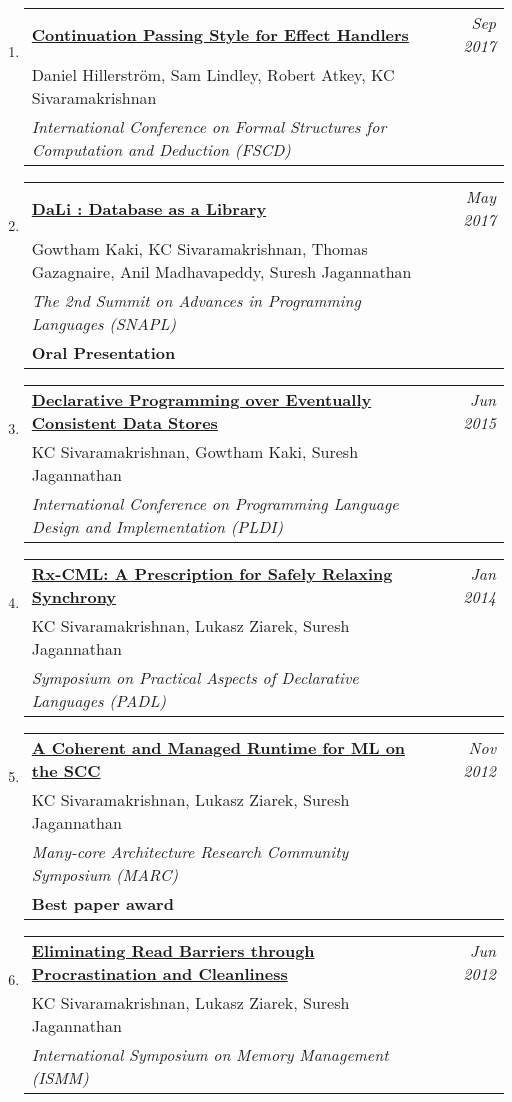 \documentclass[10pt]{article}
\makeatletter
\newcommand{\lbar}[1]{{\color{#1}\ding{118}}\hspace*{2pt}}
\newenvironment{benumerate}[2]{
    \let\oldItem\item
    \def\item{\addtocounter{enumi}{-2}\oldItem}
    \begin{enumerate}[#2] \itemsep3pt
    \setcounter{enumi}{#1}
    \addtocounter{enumi}{1}}
  {\end{enumerate}}
\newenvironment{publication}[5]
{ \item
  \begin{tabular*}{7.5in}{p{6.3in}@{\extracolsep{\fill}}r}
    \href{#1}{\textbf{#2}} & \textit{#3}\\ #4 &\\ \textit{#5}&\\
  \end{tabular*}
} {}
\newenvironment{publicationNote}[6]
{ \item
  \begin{tabular*}{7.5in}{p{6.3in}@{\extracolsep{\fill}}r}
    \href{#1}{\textbf{#2}} & \textit{#3}\\ #4 &\\ \textit{#5}\\ \textbf{#6} \\
  \end{tabular*}
} {}
\newenvironment{region}[3]{%
  \vspace*{0.5ex}
  {\scalebox{1.4}{\textbf{#1}}}
  \begin{benumerate}{#3}{\color{RoyalBlue}#2}}
  {\end{benumerate}\vspace{0.8ex}}
\makeatother
\begin{document}
\begin{region} {\lbar{purple}Conference Publications}{{C}1}{9}
	\begin{publication} {http://kcsrk.info/papers/cps-handler-fscd17.pdf}
		{Continuation Passing Style for Effect Handlers}
		{Sep 2017} {Daniel Hillerström, Sam Lindley, Robert Atkey, KC Sivaramakrishnan}
		{International Conference on Formal Structures for Computation and Deduction (FSCD)}
	\end{publication}

	\begin{publicationNote} {http://kcsrk.info/papers/dali_snapl17.pdf}
		{DaLi : Database as a Library}
		{May 2017} {Gowtham Kaki, KC Sivaramakrishnan, Thomas Gazagnaire, Anil Madhavapeddy, Suresh Jagannathan}
		{The 2nd Summit on Advances in Programming Languages (SNAPL)}
		{Oral Presentation}
	\end{publicationNote}

	\begin{publication} {http://kcsrk.info/papers/quelea_pldi15.pdf}
		{Declarative Programming over Eventually Consistent Data Stores}
		{Jun 2015} {KC Sivaramakrishnan, Gowtham Kaki, Suresh Jagannathan}
		{International Conference on Programming Language Design and Implementation (PLDI)}
	\end{publication}

	\begin{publication}{http://kcsrk.info/papers/rxcml_padl14.pdf}
		{Rx-CML: A Prescription for Safely Relaxing Synchrony}
		{Jan 2014}{KC Sivaramakrishnan, Lukasz Ziarek, Suresh Jagannathan}
		{Symposium on Practical Aspects of Declarative Languages (PADL)}
	\end{publication}

	\begin{publicationNote}{http://kcsrk.info/papers/mmscc_marc12.pdf}
		{A Coherent and Managed Runtime for ML on the SCC}
		{Nov 2012}{KC Sivaramakrishnan, Lukasz Ziarek, Suresh Jagannathan}
		{Many-core Architecture Research Community Symposium (MARC)}
		{Best paper award}
	\end{publicationNote}

	\begin{publication}{http://kcsrk.info/papers/mmgc_ismm12.pdf}
		{Eliminating Read Barriers through Procrastination and Cleanliness}
		{Jun 2012}{KC Sivaramakrishnan, Lukasz Ziarek, Suresh Jagannathan}
		{International Symposium on Memory Management (ISMM)}
	\end{publication}


\end{region}
\end{document}
